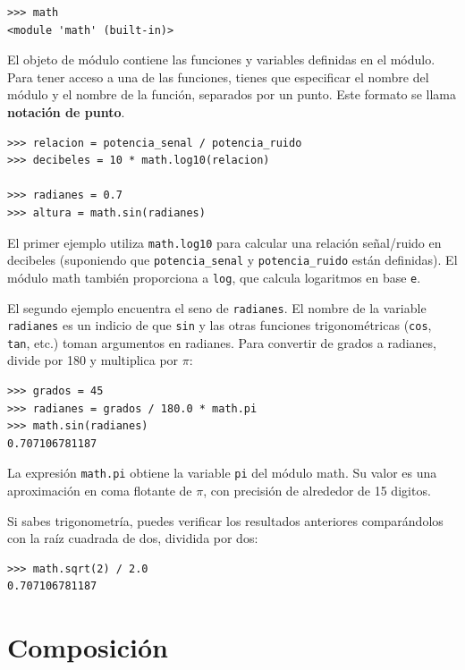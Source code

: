 \documentclass[10pt]{book}
\begin{document}
\begin{verbatim}
>>> math
<module 'math' (built-in)>
\end{verbatim}
%
El objeto de módulo contiene las funciones y variables definidas en el
módulo. Para tener acceso a una de las funciones, tienes que especificar el nombre
del módulo y el nombre de la función, separados por un punto.
Este formato se llama {\bf notación de punto}.

\begin{verbatim}
>>> relacion = potencia_senal / potencia_ruido
>>> decibeles = 10 * math.log10(relacion)

>>> radianes = 0.7
>>> altura = math.sin(radianes)
\end{verbatim}
%
El primer ejemplo utiliza \verb"math.log10" para calcular
una relación señal/ruido en decibeles (suponiendo que \verb"potencia_senal" y
\verb"potencia_ruido" están definidas).  El módulo math también proporciona a {\tt log},
que calcula logaritmos en base {\tt e}.

El segundo ejemplo encuentra el seno de {\tt radianes}.  El nombre de la variable {\tt radianes} es un indicio de que {\tt sin} y las otras funciones
trigonométricas ({\tt cos}, {\tt tan}, etc.)  toman argumentos en radianes. Para
convertir de grados a radianes, divide por 180 y multiplica por
$\pi$:

\begin{verbatim}
>>> grados = 45
>>> radianes = grados / 180.0 * math.pi
>>> math.sin(radianes)
0.707106781187
\end{verbatim}
%
La expresión {\tt math.pi} obtiene la variable {\tt pi} del módulo
math.  Su valor es una aproximación en coma flotante
de $\pi$, con precisión de alrededor de 15 digitos.

Si sabes
trigonometría, puedes verificar los resultados anteriores comparándolos con
la raíz cuadrada de dos, dividida por dos:

\begin{verbatim}
>>> math.sqrt(2) / 2.0
0.707106781187
\end{verbatim}
%

\section{Composición}
\end{document}
